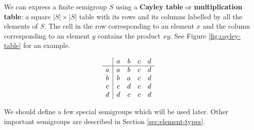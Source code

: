 \begin{definition}
  \label{def:cayley-table}
  We can express a finite semigroup $S$ using a \textbf{Cayley table} or
  \textbf{multiplication table}: a square $|S| \times |S|$ table with its rows
  and its columns labelled by all the elements of $S$.  The cell in the row
  corresponding to an element $x$ and the column corresponding to an element $y$
  contains the product $xy$.  See Figure \ref{fig:cayley-table} for an example.

  \begin{table}[ht]
    \centering
    \renewcommand\arraystretch{1.2}
    $$
    \begin{array}{c | c c c c}
      & a & b & c & d \\
      \hline
      a & a & b & c & d \\
      b & b & a & c & d \\
      c & c & d & c & d \\
      d & d & c & c & d \\
    \end{array}
    $$
    \renewcommand\arraystretch{0.7}
    \caption{Cayley table of a semigroup with four elements}
    \label{fig:cayley-table}
  \end{table}
\end{definition}

We should define a few special semigroups which will be used later.  Other
important semigroups are described in Section \ref{sec:element-types}.

